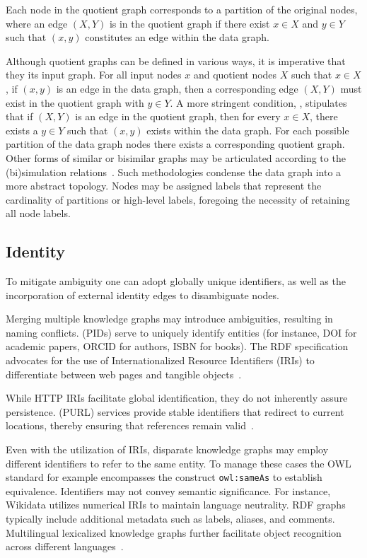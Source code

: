 Each node in the quotient graph corresponds to a partition of the original nodes, where an edge $(X,Y)$ is in the quotient graph if there exist $x\in X$ and $y\in Y$ such that $(x,y)$ constitutes an edge within the data graph.

Although quotient graphs can be defined in various ways, it is imperative that they  its input graph. For all input nodes $x$ and quotient nodes $X$ such that $x\in X$, if $(x,y)$ is an edge in the data graph, then a corresponding edge $(X,Y)$ must exist in the quotient graph with $y\in Y$. A more stringent condition, , stipulates that if $(X,Y)$ is an edge in the quotient graph, then for every $x\in X$, there exists a $y\in Y$ such that $(x,y)$ exists within the data graph.
For each possible partition of the data graph nodes there exists a  corresponding quotient graph. Other forms of similar or bisimilar graphs may be articulated according to the (bi)simulation relations~\cite{Cebiric2019SummarizingSemanticGraphs}. Such methodologies condense the data graph into a more abstract topology. Nodes may be assigned labels that represent the cardinality of partitions or high-level labels, foregoing the necessity of retaining all node labels.

\subsection{Identity}\label{identity}
To mitigate ambiguity one can adopt globally unique identifiers, as well as the incorporation of external identity edges to disambiguate nodes.

Merging multiple knowledge graphs may introduce ambiguities, resulting in naming conflicts.  (PIDs) serve to uniquely identify entities (for instance, DOI for academic papers, ORCID for authors, ISBN for books). The RDF specification advocates for the use of Internationalized Resource Identifiers (IRIs) to differentiate between web pages and tangible objects~\cite{Hakala2010PIDs}.

While HTTP IRIs facilitate global identification, they do not inherently assure persistence.  (PURL) services provide stable identifiers that redirect to current locations, thereby ensuring that references remain valid~\cite{BernersLee2006LinkedData}\cite{Heath2011LinkedData}.

Even with the utilization of IRIs, disparate knowledge graphs may employ different identifiers to refer to the same entity. To manage these cases the OWL standard for example encompasses the construct \texttt{owl:sameAs} to establish equivalence.
Identifiers may not convey semantic significance. For instance, Wikidata utilizes numerical IRIs to maintain language neutrality. RDF graphs typically include additional metadata such as labels, aliases, and comments. Multilingual lexicalized knowledge graphs further facilitate object recognition across different languages~\cite{DeMelo2015Lexvo.org, MartinezRodriguez2020InformationExtractionMeetsSemanticWeb}.  

